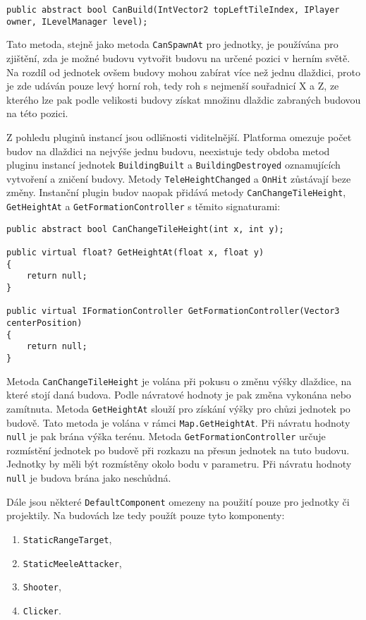 \begin{lstlisting}
public abstract bool CanBuild(IntVector2 topLeftTileIndex, IPlayer owner, ILevelManager level);
\end{lstlisting}

Tato metoda, stejně jako metoda \texttt{CanSpawnAt} pro jednotky, je používána pro zjištění, zda je možné budovu vytvořit budovu na určené pozici v herním světě. Na rozdíl od jednotek ovšem budovy mohou zabírat více než jednu dlaždici, proto je zde udáván pouze levý horní roh, tedy roh s nejmenší souřadnicí X a Z, ze kterého lze pak podle velikosti budovy získat množinu dlaždic zabraných budovou na této pozici. 


Z pohledu pluginů instancí jsou odlišnosti viditelnější. Platforma omezuje počet budov na dlaždici na nejvýše jednu budovu, neexistuje tedy obdoba metod pluginu instancí jednotek \texttt{BuildingBuilt} a \texttt{BuildingDestroyed} oznamujících vytvoření a zničení budovy. Metody \texttt{TeleHeightChanged} a \texttt{OnHit} zůstávají beze změny. Instanční plugin budov naopak přidává metody \texttt{CanChangeTileHeight}, \texttt{GetHeightAt} a \texttt{GetFormationController} s těmito signaturami:

\begin{lstlisting}
public abstract bool CanChangeTileHeight(int x, int y);

public virtual float? GetHeightAt(float x, float y)
{
	return null;
}

public virtual IFormationController GetFormationController(Vector3 centerPosition)
{
	return null;
}
\end{lstlisting}

Metoda \texttt{CanChangeTileHeight} je volána při pokusu o změnu výšky dlaždice, na které stojí daná budova. Podle návratové hodnoty je pak změna vykonána nebo zamítnuta. Metoda \texttt{GetHeightAt} slouží pro získání výšky pro chůzi jednotek po budově. Tato metoda je volána v rámci \texttt{Map.GetHeightAt}. Při návratu hodnoty \texttt{null} je pak brána výška terénu. Metoda \texttt{GetFormationController} určuje rozmístění jednotek po budově při rozkazu na přesun jednotek na tuto budovu. Jednotky by měli být rozmístěny okolo bodu v parametru. Při návratu hodnoty \texttt{null} je budova brána jako neschůdná.


Dále jsou některé \texttt{DefaultComponent} omezeny na použití pouze pro jednotky či projektily. Na budovách lze tedy použít pouze tyto komponenty:
\begin{enumerate}
	\item \texttt{StaticRangeTarget},
	\item \texttt{StaticMeeleAttacker},
	\item \texttt{Shooter},
	\item \texttt{Clicker}.
\end{enumerate}

